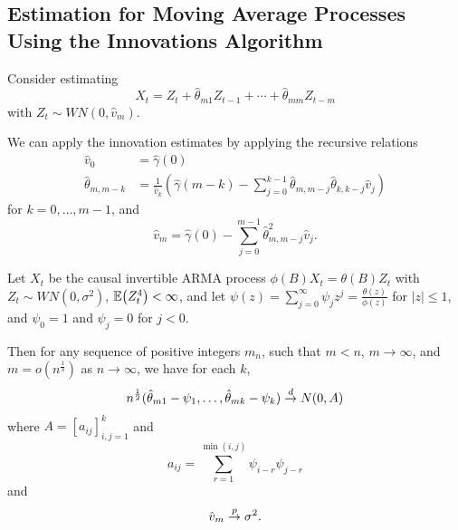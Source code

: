 \subsection{Estimation for Moving Average Processes Using the Innovations Algorithm}
\label{sec:estim-moving-aver}

Consider estimating
\begin{equation}
  \label{eq:52}
  X_{t} = Z_{t} + \hat \theta_{m1} Z_{t-1} + \cdots + \hat \theta_{mm} Z_{t-m}
\end{equation} with $Z_{t} \sim WN(0, \hat v_{m})$.

\begin{thm}
  \label{defn:estimation_arma:5}
  We can apply the innovation estimates by applying the recursive
  relations
  \begin{align}
    \label{eq:53}
    \hat v_{0} &= \hat \gamma(0) \\
    \hat \theta_{m, m - k} &= \frac{1}{\hat v_{k}}( \hat \gamma(m-k) -
    \sum_{j=0}^{k-1} \hat \theta_{m, m - j} \hat \theta_{k, k - j}
    \hat v_{j})
  \end{align} for $k = 0, \dots, m - 1$, and
  \begin{equation}
    \label{eq:54}
    \hat v_{m} = \hat \gamma(0) - \sum_{j=0}^{m-1} \hat \theta^{2}_{m,
      m - j} \hat v_{j}.
  \end{equation}
\end{thm}

\begin{thm}
  \label{defn:estimation_arma:6}
  Let $X_{t}$ be the causal invertible \textsc{ARMA} process $\phi(B) X_{t} =
  \theta(B) Z_{t}$ with $Z_{t} \sim WN(0, \sigma^{2})$, $\E{Z_{t}^{4}}
  < \infty$, and let $\psi(z) = \sum_{j=0}^{\infty} \psi_{j} z^{j} =
  \frac{\theta(z)}{\phi(z)}$ for $|z| \leq 1$, and $\psi_{0} = 1$ and
  $\psi_{j} = 0$ for $j < 0$.

  Then for any sequence of positive integers $m_{n}$, such that $m <
  n$, $m \rightarrow \infty$, and $m = o(n^{\frac{1}{3}})$ as $n
  \rightarrow \infty$, we have for each $k$,
  \begin{align}
    \label{eq:55}
    n^{\frac{1}{2}}(\hat \theta_{m1} - \psi_{1}, \dots, \hat
    \theta_{mk} - \psi_{k}) \overset{d}{\rightarrow} N(0, A)
  \end{align} where $A = [a_{ij}]_{i, j = 1}^{k}$ and
  \begin{equation}
    \label{eq:56}
    a_{ij} = \sum_{r=1}^{\min(i, j)} \psi_{i - r} \psi_{j - r}
  \end{equation} and
  \begin{equation}
    \label{eq:57}
    \hat v_{m} \overset{p}{\rightarrow} \sigma^{2}.
  \end{equation}
\end{thm}

